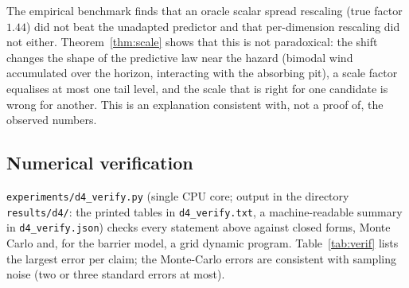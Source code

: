 \begin{remark}
The empirical benchmark finds that an oracle scalar spread rescaling (true factor $1.44$) did not beat the unadapted predictor and that per-dimension rescaling did not either.
Theorem~\ref{thm:scale} shows that this is not paradoxical: the shift changes the shape of the predictive law near the hazard (bimodal wind accumulated over the horizon, interacting with the absorbing pit), a scale factor equalises at most one tail level, and the scale that is right for one candidate is wrong for another. This is an explanation consistent with, not a proof of, the observed numbers.
\end{remark}

\subsection{Numerical verification}\label{sec:verification}

\texttt{experiments/d4\_verify.py} (single CPU core; output in the directory \texttt{results/d4/}: the printed tables in \texttt{d4\_verify.txt}, a machine-readable summary in \texttt{d4\_verify.json}) checks every statement above against closed forms, Monte Carlo and, for the barrier model, a grid dynamic program.
Table~\ref{tab:verif} lists the largest error per claim; the Monte-Carlo errors are consistent with sampling noise (two or three standard errors at most).

